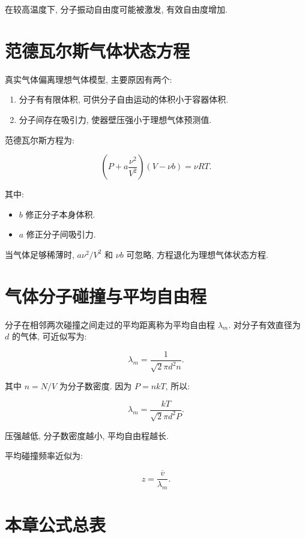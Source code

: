 \documentclass[
  a4paper,
]{ctexrep}
\providecommand{\tightlist}{%
  \setlength{\itemsep}{0pt}\setlength{\parskip}{0pt}}
\begin{document}
在较高温度下, 分子振动自由度可能被激发, 有效自由度增加.

\section{范德瓦尔斯气体状态方程}\label{ux8303ux5fb7ux74e6ux5c14ux65afux6c14ux4f53ux72b6ux6001ux65b9ux7a0b}

真实气体偏离理想气体模型, 主要原因有两个:

\begin{enumerate}
\def\labelenumi{\arabic{enumi}.}
\tightlist
\item
  分子有有限体积, 可供分子自由运动的体积小于容器体积.
\item
  分子间存在吸引力, 使器壁压强小于理想气体预测值.
\end{enumerate}

范德瓦尔斯方程为:

\[
\left(P+a\frac{\nu^2}{V^2}\right)(V-\nu b)=\nu RT.
\]

其中:

\begin{itemize}
\tightlist
\item
  \(b\) 修正分子本身体积.
\item
  \(a\) 修正分子间吸引力.
\end{itemize}

当气体足够稀薄时, \(a\nu^2/V^2\) 和 \(\nu b\) 可忽略,
方程退化为理想气体状态方程.

\section{气体分子碰撞与平均自由程}\label{ux6c14ux4f53ux5206ux5b50ux78b0ux649eux4e0eux5e73ux5747ux81eaux7531ux7a0b}

分子在相邻两次碰撞之间走过的平均距离称为平均自由程 \(\lambda_m\).
对分子有效直径为 \(d\) 的气体, 可近似写为:

\[
\lambda_m=\frac{1}{\sqrt{2}\pi d^2 n}.
\]

其中 \(n=N/V\) 为分子数密度. 因为 \(P=nkT\), 所以:

\[
\lambda_m=\frac{kT}{\sqrt{2}\pi d^2P}.
\]

压强越低, 分子数密度越小, 平均自由程越长.

平均碰撞频率近似为:

\[
z=\frac{\overline{v}}{\lambda_m}.
\]

\section{本章公式总表}\label{ux672cux7ae0ux516cux5f0fux603bux8868-3}
\end{document}
